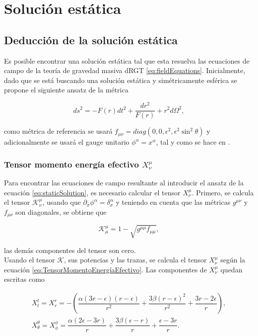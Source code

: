 \chapter{Solución estática}
\label{chap:staticSolution}

\section{Deducción de la solución estática}

Es posible encontrar una solución estática tal que esta resuelva las ecuaciones de campo de la teoría de gravedad masiva dRGT \eqref{eq:fieldEquations}. Inicialmente, dado que se está buscando una solución estática y simétricamente esférica se propone el siguiente ansatz de la métrica

\begin{equation}
    ds^2=-F(r)dt^2+\dfrac{dr^2}{F(r)}+r^2d\Omega^2,
    \label{eq:staticSolution}
\end{equation}

como métrica de referencia se usará $f_{\mu\nu}=diag(0,0,\epsilon^2,\epsilon^2\sin^2\theta)$ y adicionalmente se usará el gauge unitario $\phi^\alpha=x^{\alpha}$, tal y como se hace en \cite{AClassOfBlackHoles}.

\subsection{Tensor momento energía efectivo $X^\mu_{\nu}$}

Para encontrar las ecuaciones de campo resultante al introducir el ansatz de la ecuación \eqref{eq:staticSolution}, es necesario calcular el tensor $X^\mu_\nu$. Primero, se calcula el tensor $\mathcal{K}^\mu_\nu$, usando que $\partial_\sigma\phi^\alpha=\delta^\alpha_\sigma$ y teniendo en cuenta que las métricas $g^{\mu\nu}$ y $f_{\mu\nu}$ son diagonales, se obtiene que

\begin{equation}
    \mathcal{K}^\mu_\mu=1-\sqrt{g^{\mu\mu}f_{\mu\mu}},
\end{equation}

las demás componentes del tensor son cero.\\

Usando el tensor $\mathcal{K}$, sus potencias y las trazas, se calcula el tensor $X^\mu_\nu$ según la ecuación \eqref{eq:TensorMomentoEnergíaEfectivo}. Las componentes de $X^\mu_\nu$ quedan escritas como

\begin{gather}
    X^t_t=X^r_r=-\left(\dfrac{\alpha(3r-\epsilon)(r-\epsilon)}{r^2}+\dfrac{3\beta(r-\epsilon)^2}{r^2}+\dfrac{3r-2\epsilon}{r}\right),\label{eq:diff1}\\
    X^\theta_\theta=X^\phi_\phi=\dfrac{\alpha(2\epsilon-3r)}{r}+\dfrac{3\beta(\epsilon-r)}{r}+\dfrac{\epsilon-3r}{r}.
\end{gather}

